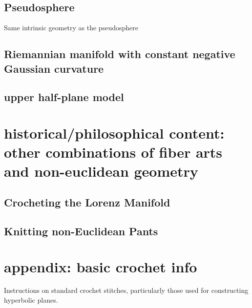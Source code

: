 \documentclass[letterpaper,titlepage]{article}
\begin{document}
\subsection{Pseudosphere}
Same intrinsic geometry as the pseudosphere
\subsection{Riemannian manifold with constant negative Gaussian curvature}
\subsection{upper half-plane model}

\section{historical/philosophical content: other combinations of fiber arts and non-euclidean geometry}
\subsection{Crocheting the Lorenz Manifold \cite{crochetlorenz}}
\subsection{Knitting non-Euclidean Pants \cite{makingmath}}

\section*{appendix: basic crochet info}
Instructions on standard crochet stitches, particularly those used for constructing hyperbolic planes. \cite{happyhooker}

\newpage


\end{document}
